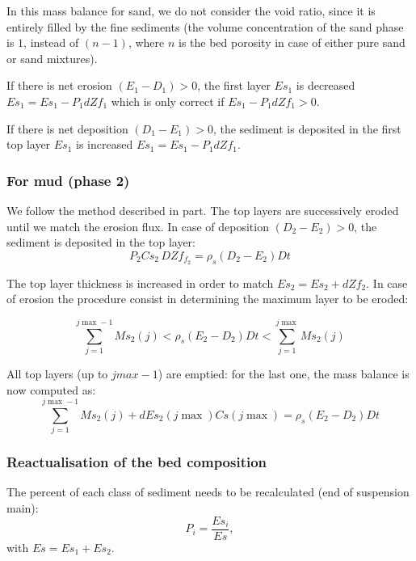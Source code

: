 In this mass balance for sand, we do not consider the void ratio, since it
is entirely filled by the fine sediments (the volume concentration of the
sand phase is $1$, instead of $(n-1)$, where $n$ is the bed porosity in case of
either pure sand or sand mixtures).

If there is net erosion $(E_1-D_1) > 0$, the first layer $Es_1$ is
decreased $Es_1=Es_1-P_1dZf_1$ which is only correct if $Es_1-P_1dZf_1>0$.

If there is net deposition $(D_1-E_1)>0$, the sediment is deposited in
the first top layer $Es_1$ is increased $Es_1=Es_1-P_1dZf_{1}$.

\subsubsection{For mud (phase 2)}
We follow the method described in part. The top layers are successively
eroded until we match the erosion flux. In case of deposition $(D_2-E_2)>0$, the sediment is deposited in the
top layer:
\begin{equation*}
P_2 C s_2 \,DZf_{f_2} =\rho_s (D_2 - E_2) Dt 
\end{equation*}

The top layer thickness is increased in order to match $Es_2= Es_2+dZf_2$.
In case of erosion the procedure consist in determining the maximum layer to
be eroded:

\begin{equation*}
\sum\limits_{j=1}^{j\max -1} Ms_{2}(j) < \rho_s(E_2-D_2)Dt< \sum\limits_{j=1}^{j\max } Ms_2(j) 
\end{equation*}

All top layers (up to $jmax-1$) are emptied: for the last one, the mass balance is now computed as:
\begin{equation*}
\sum\limits_{j=1}^{j\max -1} Ms_2(j) + dEs_2(j\max)Cs(j\max)=\rho_s(E_2-D_2)Dt 
\end{equation*}

\subsubsection{Reactualisation of the bed composition}
The percent of each class of sediment needs to be recalculated (end of
suspension main):
\begin{equation*}
P_i =\frac{Es_i}{Es}, 
\end{equation*}
with $Es= Es_1+Es_2$.


